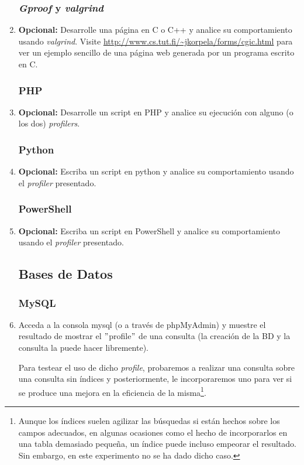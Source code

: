 \documentclass[paper=a4, fontsize=11pt]{scrartcl} %
\numberwithin{equation}{section} %
\numberwithin{figure}{section} %
\numberwithin{table}{section} %
\begin{document}
\begin{enumerate}
	\subsubsection{\textit{Gproof} y \textit{valgrind}}
		\item \textbf{Opcional:} Desarrolle una página en C o C++ y analice su comportamiento usando
		\textit{valgrind}. Visite \url{http://www.cs.tut.fi/~jkorpela/forms/cgic.html} para ver un
		ejemplo sencillo de una página web generada por un programa escrito en C.
		
	\subsubsection{PHP}
		\item \textbf{Opcional:} Desarrolle un script en PHP y analice su ejecución con alguno (o
		los dos) \textit{profilers}.
		
	\subsubsection{Python}
		\item \textbf{Opcional:} Escriba un script en python y analice su comportamiento usando el
		\textit{profiler} presentado.
		
	\subsubsection{PowerShell}
		\item \textbf{Opcional:} Escriba un script en PowerShell y analice su comportamiento
		usando el \textit{profiler} presentado.
		
	\subsection{Bases de Datos}
	\subsubsection{MySQL}
		\item Acceda a la consola mysql (o a través de phpMyAdmin) y muestre el resultado de mostrar
		el $"$profile$"$ de una consulta (la creación de la BD y la consulta la puede hacer libremente).
		
		Para testear el uso de dicho \textit{profile}, probaremos a realizar una consulta sobre una
		consulta sin índices y posteriormente, le incorporaremos uno para ver si se produce una mejora
		en la eficiencia de la misma\footnote{Aunque los índices suelen agilizar las búsquedas si están
		hechos sobre los campos adecuados, en algunas ocasiones como el hecho de incorporarlos en una
		tabla demasiado pequeña, un índice puede incluso empeorar el resultado. Sin embargo, en este
		experimento no se ha dado dicho caso.}.
		

\end{enumerate}
\end{document}
